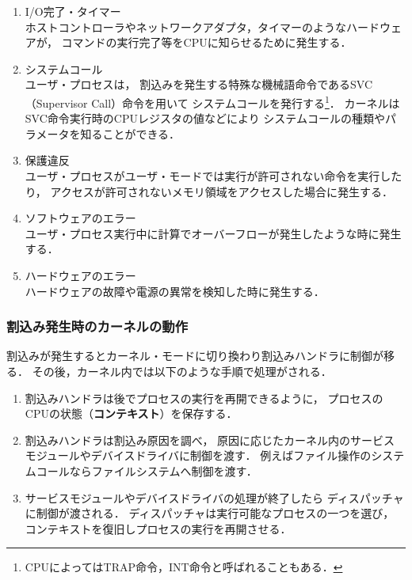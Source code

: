 \begin{enumerate}
\item I/O完了・タイマー \\
ホストコントローラやネットワークアダプタ，タイマーのようなハードウェアが，
コマンドの実行完了等をCPUに知らせるために発生する．

\item システムコール \\
ユーザ・プロセスは，
割込みを発生する特殊な機械語命令であるSVC（Supervisor Call）命令を用いて
システムコールを発行する\footnote{
CPUによってはTRAP命令，INT命令と呼ばれることもある．}．
カーネルはSVC命令実行時のCPUレジスタの値などにより
システムコールの種類やパラメータを知ることができる．

\item 保護違反 \\
ユーザ・プロセスがユーザ・モードでは実行が許可されない命令を実行したり，
アクセスが許可されないメモリ領域をアクセスした場合に発生する．

\item ソフトウェアのエラー \\
ユーザ・プロセス実行中に計算でオーバーフローが発生したような時に発生する．

\item ハードウェアのエラー \\
ハードウェアの故障や電源の異常を検知した時に発生する．

\end{enumerate}

\subsubsection{割込み発生時のカーネルの動作}
割込みが発生するとカーネル・モードに切り換わり割込みハンドラに制御が移る．
その後，カーネル内では以下のような手順で処理がされる．

\begin{enumerate}
\item 割込みハンドラは後でプロセスの実行を再開できるように，
プロセスのCPUの状態（{\bf コンテキスト}）を保存する．

\item 割込みハンドラは割込み原因を調べ，
原因に応じたカーネル内のサービスモジュールやデバイスドライバに制御を渡す．
例えばファイル操作のシステムコールならファイルシステムへ制御を渡す．

\item サービスモジュールやデバイスドライバの処理が終了したら
ディスパッチャに制御が渡される．
ディスパッチャは実行可能なプロセスの一つを選び，
コンテキストを復旧しプロセスの実行を再開させる．
\end{enumerate}

